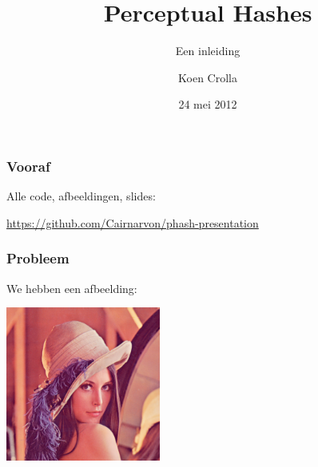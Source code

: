 \documentclass{beamer}
\title{Perceptual Hashes}
\subtitle{Een inleiding}
\author{Koen Crolla}
\date{24 mei 2012}
\begin{document}
{ \maketitle}

\begin{frame}
  \frametitle{Vooraf}

  Alle code, afbeeldingen, slides:

  \centering

  \LARGE \url{https://github.com/Cairnarvon/phash-presentation}

\end{frame}



\begin{frame}
  \frametitle{Probleem}

  We hebben een afbeelding:

  \centering

  \includegraphics[height=2in]{../target.png}

\end{frame}
\end{document}
